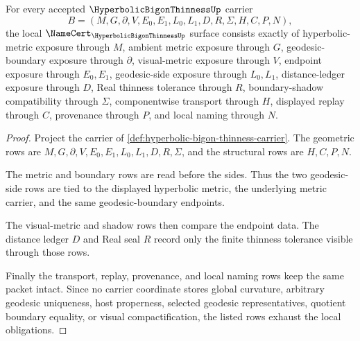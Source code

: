 \begin{theorem}\label{thm:hyperbolic-bigon-thinness-namecert-obligations}
For every accepted $\HyperbolicBigonThinnessUp$ carrier
$$
B=(M,G,\partial,V,E_0,E_1,L_0,L_1,D,R,\Sigma,H,C,P,N),
$$
the local $\NameCert_{\HyperbolicBigonThinnessUp}$ surface consists exactly of hyperbolic-metric exposure through $M$, ambient metric exposure through $G$, geodesic-boundary exposure through $\partial$, visual-metric exposure through $V$, endpoint exposure through $E_0,E_1$, geodesic-side exposure through $L_0,L_1$, distance-ledger exposure through $D$, Real thinness tolerance through $R$, boundary-shadow compatibility through $\Sigma$, componentwise transport through $H$, displayed replay through $C$, provenance through $P$, and local naming through $N$.
\end{theorem}
\begin{proof}
Project the carrier of \autoref{def:hyperbolic-bigon-thinness-carrier}. The geometric rows are $M,G,\partial,V,E_0,E_1,L_0,L_1,D,R,\Sigma$, and the structural rows are $H,C,P,N$.

The metric and boundary rows are read before the sides. Thus the two geodesic-side rows are tied to the displayed hyperbolic metric, the underlying metric carrier, and the same geodesic-boundary endpoints.

The visual-metric and shadow rows then compare the endpoint data. The distance ledger $D$ and Real seal $R$ record only the finite thinness tolerance visible through those rows.

Finally the transport, replay, provenance, and local naming rows keep the same packet intact. Since no carrier coordinate stores global curvature, arbitrary geodesic uniqueness, host properness, selected geodesic representatives, quotient boundary equality, or visual compactification, the listed rows exhaust the local obligations.
\end{proof}

